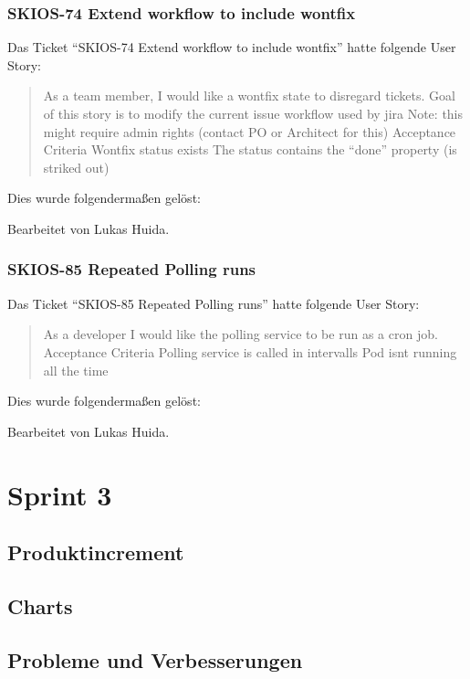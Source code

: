 \subsubsection{SKIOS-74 Extend workflow to include wontfix}
Das Ticket \enquote{SKIOS-74 Extend workflow to include wontfix} hatte folgende User Story:
\begin{quotation}
    As a team member, I would like a wontfix state  to disregard tickets.
    Goal of this story is to modify the current issue workflow used by jira
    Note: this might require admin rights (contact PO or Architect for this)
    Acceptance Criteria
    Wontfix status exists
    The status contains the “done” property (is striked out)
\end{quotation}
Dies wurde folgendermaßen gelöst:
\begin{quotation}
    
\end{quotation}
Bearbeitet von Lukas Huida.

\subsubsection{SKIOS-85 Repeated Polling runs}
Das Ticket \enquote{SKIOS-85 Repeated Polling runs} hatte folgende User Story:
\begin{quotation}
    As a developer I would like the polling service to be run as a cron job.
    Acceptance Criteria
    Polling service is called in intervalls
    Pod isnt running all the time
\end{quotation}
Dies wurde folgendermaßen gelöst:
\begin{quotation}
    
\end{quotation}
Bearbeitet von Lukas Huida.

\section{Sprint 3}

\subsection{Produktincrement}
\subsection{Charts}
\subsection{Probleme und Verbesserungen}


